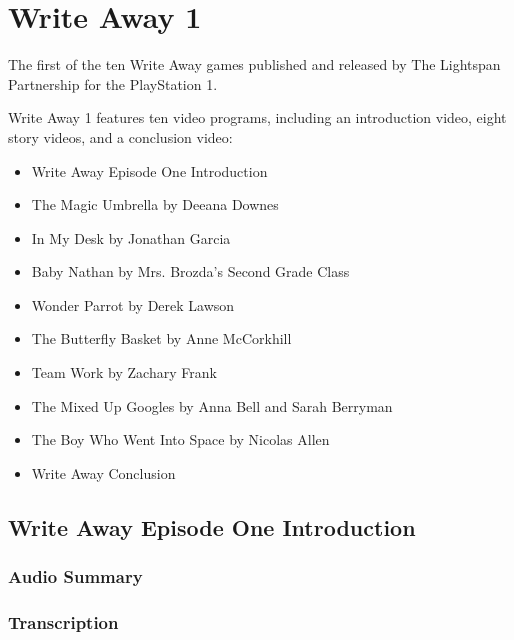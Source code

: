 \chapter{Write Away 1}


The first of the ten Write Away games published and released by The Lightspan Partnership for the PlayStation 1.

Write Away 1 features ten video programs, including an introduction video, eight story videos, and a conclusion video:

\begin{itemize}
    \item Write Away Episode One Introduction
    \item The Magic Umbrella by Deeana Downes
    \item In My Desk by Jonathan Garcia
    \item Baby Nathan by Mrs. Brozda's Second Grade Class
    \item Wonder Parrot by Derek Lawson
    \item The Butterfly Basket by Anne McCorkhill
    \item Team Work by Zachary Frank
    \item The Mixed Up Googles by Anna Bell and Sarah Berryman
    \item The Boy Who Went Into Space by Nicolas Allen
    \item Write Away Conclusion
\end{itemize}

\clearpage
\newpage

\section{Write Away Episode One Introduction}

\subsection{Audio Summary}

\subsection{Transcription}

